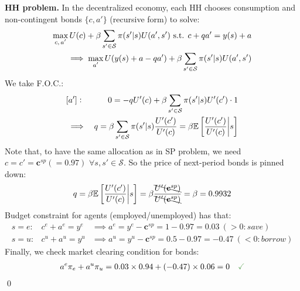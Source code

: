 \begin{solution}
    \par \noindent \colorbox{black!12}{\textbf{HH problem.}} In the decentralized economy, each HH chooses consumption
    and non-contingent bonds $\{c, a'\}$ (recursive form) to solve:
    \begin{eqnarray}
        \max\limits_{\text{\scriptsize $c, a'$}} U(c) + \beta \displaystyle\sum_{s' \in \mathcal{S}} \pi(s'|s) U(a', s')
        \text{ s.t. } c + qa' = y(s) + a \\
        \implies \max\limits_{\text{\scriptsize $a'$}} U(y(s)+a-qa') + \beta \displaystyle\sum_{s' \in \mathcal{S}} \pi(s'|s) U(a', s')
    \end{eqnarray} We take F.O.C.:
    \begin{eqnarray}
        & [a']: & 0 = -q U'(c) + \beta \displaystyle\sum_{s' \in \mathcal{S}} \pi(s'|s) U'(c') \cdot 1 \\
        & \implies & q = \beta \displaystyle\sum_{s' \in \mathcal{S}} \pi(s'|s) \frac{U'(c')}{U'(c)} = \beta \mathbb{E}\left[\frac{U'(c')}{U'(c)} \middle| {s}\right]
    \end{eqnarray} Note that, to have the same allocation as in SP problem,
    we need $c = c' = \mathbf{c}^{sp} (= 0.97)$ $\forall s, s' \in \mathcal{S}$.
    So the price of next-period bonds is pinned down: \begin{eqnarray}
        q = \beta \mathbb{E}\left[\frac{U'(c')}{U'(c)} \middle| {s}\right] = \beta \frac{\bcancel{U'(\mathbf{c}^{sp})}}{\bcancel{U'(\mathbf{c}^{sp})}} = \beta = 0.9932
    \end{eqnarray} Budget constraint for agents (employed/unemployed) has that:
    \begin{eqnarray}
        s = e: & c^e + a^e = y^e & \implies a^e = y^e - \mathbf{c}^{sp} = 1 - 0.97 = 0.03\ (>0: save)\\
        s = u: & c^u + a^u = y^u & \implies a^u = y^u - \mathbf{c}^{sp} = 0.5 - 0.97 = -0.47\ (<0: borrow)
    \end{eqnarray} Finally, we check market clearing condition for bonds: \begin{eqnarray}
        a^e \pi_e + a^u \pi_u = 0.03 \times 0.94 + (-0.47) \times 0.06 = 0 \quad {\color{green} {\textbf{\checkmark}}}
    \end{eqnarray} \qed
\end{solution}


